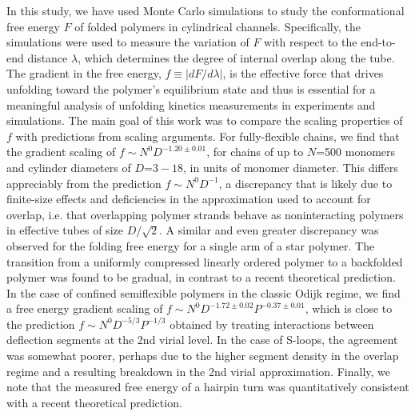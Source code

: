 \documentclass[journal=mamobx,manuscript=article,layout=twocolumn]{achemso}
\begin{document}
In this study, we have used Monte Carlo simulations to study the conformational free
energy $F$ of folded polymers in cylindrical channels. Specifically, the simulations were 
used to measure the variation of $F$ with respect to the end-to-end distance $\lambda$, 
which determines the degree of internal overlap along the tube. The gradient in 
the free energy, $f\equiv |dF/d\lambda|$, is the effective force that drives unfolding toward 
the polymer's equilibrium state and thus is essential for a meaningful analysis of unfolding 
kinetics measurements in experiments and simulations. The main goal of this work was to 
compare the scaling properties of $f$ with predictions from scaling arguments.
For fully-flexible chains, we find that the gradient scaling of $f\sim N^0 D^{-1.20\pm 0.01}$,
for chains of up to $N$=500 monomers and cylinder diameters of $D$=$3-18$, in units of monomer
diameter. This differs appreciably from the prediction $f\sim N^0 D^{-1}$, a discrepancy that
is likely due to finite-size effects and deficiencies in the approximation used to account
for overlap, i.e. that overlapping polymer strands behave as noninteracting polymers in
effective tubes of size $D/\sqrt{2}$.\cite{jung2012ring} 
A similar and even greater discrepancy was observed 
for the folding free energy for a single arm of a star polymer. The transition from a 
uniformly compressed linearly ordered polymer to a backfolded polymer was found to be gradual, 
in contrast to a recent theoretical prediction. In the case of confined semiflexible polymers
in the classic Odijk regime, we find a free energy gradient scaling of
$f\sim N^0 D^{-1.72\pm 0.02} P^{-0.37\pm 0.01}$, which is close to the 
prediction $f\sim N^0 D^{-5/3} P^{-1/3}$ obtained by treating interactions between
deflection segments at the 2nd virial level. In the case of S-loops, the agreement
was somewhat poorer, perhaps due to the higher segment density in the overlap regime and
a resulting breakdown in the 2nd virial approximation. Finally, we note that the measured
free energy of a hairpin turn was quantitatively consistent with a recent theoretical
prediction.\cite{chen2017conformational}
\end{document}
